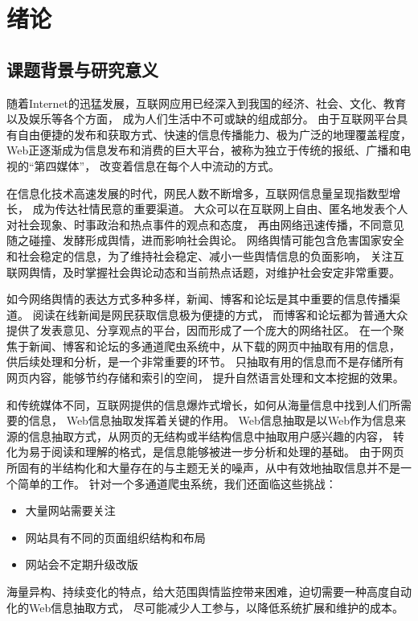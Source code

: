 
\chapter{绪论}

\section{课题背景与研究意义}
随着Internet的迅猛发展，互联网应用已经深入到我国的经济、社会、文化、教育以及娱乐等各个方面，
成为人们生活中不可或缺的组成部分。
由于互联网平台具有自由便捷的发布和获取方式、快速的信息传播能力、极为广泛的地理覆盖程度，
Web正逐渐成为信息发布和消费的巨大平台，被称为独立于传统的报纸、广播和电视的“第四媒体”，
改变着信息在每个人中流动的方式。

在信息化技术高速发展的时代，网民人数不断增多，互联网信息量呈现指数型增长，
成为传达社情民意的重要渠道。
大众可以在互联网上自由、匿名地发表个人对社会现象、时事政治和热点事件的观点和态度，
再由网络迅速传播，不同意见随之碰撞、发酵形成舆情，进而影响社会舆论。
网络舆情可能包含危害国家安全和社会稳定的信息，为了维持社会稳定、减小一些舆情信息的负面影响，
关注互联网舆情，及时掌握社会舆论动态和当前热点话题，对维护社会安定非常重要。

如今网络舆情的表达方式多种多样，新闻、博客和论坛是其中重要的信息传播渠道。
阅读在线新闻是网民获取信息极为便捷的方式，
而博客和论坛都为普通大众提供了发表意见、分享观点的平台，因而形成了一个庞大的网络社区。
在一个聚焦于新闻、博客和论坛的多通道爬虫系统中，从下载的网页中抽取有用的信息，
供后续处理和分析，是一个非常重要的环节。
只抽取有用的信息而不是存储所有网页内容，能够节约存储和索引的空间，
提升自然语言处理和文本挖掘的效果。

和传统媒体不同，互联网提供的信息爆炸式增长，如何从海量信息中找到人们所需要的信息，
Web信息抽取发挥着关键的作用。
Web信息抽取是以Web作为信息来源的信息抽取方式，从网页的无结构或半结构信息中抽取用户感兴趣的内容，
转化为易于阅读和理解的格式，是信息能够被进一步分析和处理的基础。
由于网页所固有的半结构化和大量存在的与主题无关的噪声，从中有效地抽取信息并不是一个简单的工作。
针对一个多通道爬虫系统，我们还面临这些挑战：
\begin{itemize}
\item 大量网站需要关注
\item 网站具有不同的页面组织结构和布局
\item 网站会不定期升级改版
\end{itemize}
海量异构、持续变化的特点，给大范围舆情监控带来困难，迫切需要一种高度自动化的Web信息抽取方式，
尽可能减少人工参与，以降低系统扩展和维护的成本。

